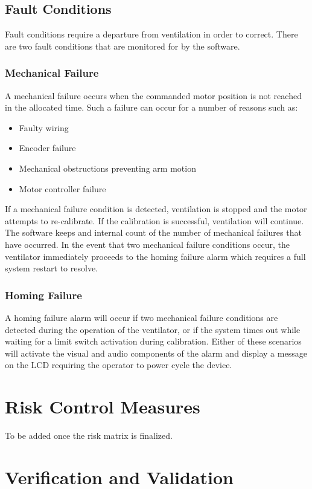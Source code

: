 \documentclass[]{article}
\begin{document}
\subsection{Fault Conditions}
Fault conditions require a departure from ventilation in order to correct.  There are two fault conditions that are monitored for by the software.

\subsubsection{Mechanical Failure}
A mechanical failure occurs when the commanded motor position is not reached in the allocated time.  Such a failure can occur for a number of reasons such as:
\begin{itemize}
	\item Faulty wiring
	\item Encoder failure
	\item Mechanical obstructions preventing arm motion
	\item Motor controller failure
\end{itemize}
If a mechanical failure condition is detected, ventilation is stopped and the motor attempts to re-calibrate.  If the calibration is successful, ventilation will continue.  The software keeps and internal count of the number of mechanical failures that have occurred.  In the event that two mechanical failure conditions occur, the ventilator immediately proceeds to the homing failure alarm which requires a full system restart to resolve.

\subsubsection{Homing Failure}
A homing failure alarm will occur if two mechanical failure conditions are detected during the operation of the ventilator, or if the system times out while waiting for a limit switch activation during calibration.  Either of these scenarios will activate the visual and audio components of the alarm and display a message on the LCD requiring the operator to power cycle the device.



\section{Risk Control Measures}

To be added once the risk matrix is finalized.

\section{Verification and Validation}
\label{sect:vandv}
\end{document}
